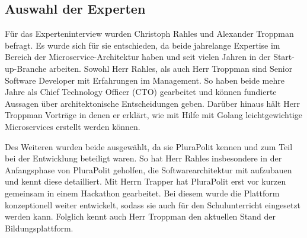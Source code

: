 \subsection{Auswahl der Experten}

Für das Experteninterview wurden Christoph Rahles und Alexander Troppman befragt. Es wurde sich für sie entschieden, da beide jahrelange Expertise im Bereich der Microservice-Architektur haben und seit vielen Jahren in der Start-up-Branche arbeiten. Sowohl Herr Rahles, als auch Herr Troppman sind Senior Software Developer mit Erfahrungen im Management. So haben beide mehre Jahre als Chief Technology Officer (CTO) gearbeitet und können fundierte Aussagen über architektonische Entscheidungen geben. Darüber hinaus hält Herr Troppman Vorträge in denen er erklärt, wie mit Hilfe mit Golang leichtgewichtige Microservices erstellt werden können.

Des Weiteren wurden beide ausgewählt, da sie PluraPolit kennen und zum Teil bei der Entwicklung beteiligt waren. So hat Herr Rahles insbesondere in der Anfangsphase von PluraPolit geholfen, die Softwarearchitektur mit aufzubauen und kennt diese detailliert.
Mit Herrn Trapper hat PluraPolit erst vor kurzen gemeinsam in einem Hackathon gearbeitet. Bei diesem wurde die Plattform konzeptionell weiter entwickelt, sodass sie auch für den Schulunterricht eingesetzt werden kann. Folglich kennt auch Herr Troppman den aktuellen Stand der Bildungsplattform.
